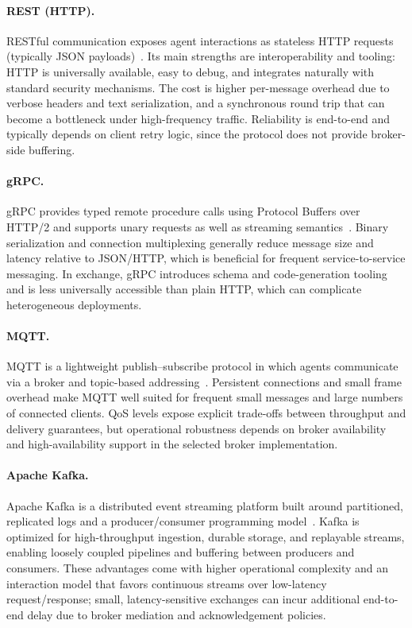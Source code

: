\paragraph{REST (HTTP).}
RESTful communication exposes agent interactions as stateless HTTP requests (typically JSON payloads)~\cite{Fielding2000REST,RFC9110}. Its main strengths are interoperability and tooling: HTTP is universally available, easy to debug, and integrates naturally with standard security mechanisms. The cost is higher per-message overhead due to verbose headers and text serialization, and a synchronous round trip that can become a bottleneck under high-frequency traffic. Reliability is end-to-end and typically depends on client retry logic, since the protocol does not provide broker-side buffering.

\paragraph{gRPC.}
gRPC provides typed remote procedure calls using Protocol Buffers over HTTP/2 and supports unary requests as well as streaming semantics~\cite{grpc_docs}. Binary serialization and connection multiplexing generally reduce message size and latency relative to JSON/HTTP, which is beneficial for frequent service-to-service messaging. In exchange, gRPC introduces schema and code-generation tooling and is less universally accessible than plain HTTP, which can complicate heterogeneous deployments.

\paragraph{MQTT.}
MQTT is a lightweight publish--subscribe protocol in which agents communicate via a broker and topic-based addressing~\cite{mqtt_org,mqtt_v5_0}. Persistent connections and small frame overhead make MQTT well suited for frequent small messages and large numbers of connected clients. QoS levels expose explicit trade-offs between throughput and delivery guarantees, but operational robustness depends on broker availability and high-availability support in the selected broker implementation.

\paragraph{Apache Kafka.}
Apache Kafka is a distributed event streaming platform built around partitioned, replicated logs and a producer/consumer programming model~\cite{apache_kafka_docs,kreps2014_benchmarking_kafka}. Kafka is optimized for high-throughput ingestion, durable storage, and replayable streams, enabling loosely coupled pipelines and buffering between producers and consumers. These advantages come with higher operational complexity and an interaction model that favors continuous streams over low-latency request/response; small, latency-sensitive exchanges can incur additional end-to-end delay due to broker mediation and acknowledgement policies.

